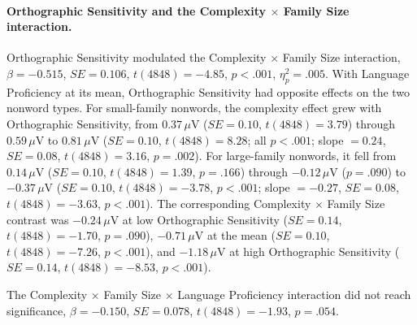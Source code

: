 \documentclass[utf8]{FrontiersinHarvard} %
\begin{document}
\paragraph*{Orthographic Sensitivity and the Complexity $\times$ Family Size interaction.} Orthographic Sensitivity modulated the Complexity $\times$ Family Size interaction, $\beta = -0.515$, $SE = 0.106$, $t(4848) = -4.85$, $p < .001$, $\eta^2_p = .005$. With Language Proficiency at its mean, Orthographic Sensitivity had opposite effects on the two nonword types. For small-family nonwords, the complexity effect grew with Orthographic Sensitivity, from $0.37\,\mu$V ($SE = 0.10$, $t(4848) = 3.79$) through $0.59\,\mu$V to $0.81\,\mu$V ($SE = 0.10$, $t(4848) = 8.28$; all $p < .001$; slope $= 0.24$, $SE = 0.08$, $t(4848) = 3.16$, $p = .002$). For large-family nonwords, it fell from $0.14\,\mu$V ($SE = 0.10$, $t(4848) = 1.39$, $p = .166$) through $-0.12\,\mu$V ($p = .090$) to $-0.37\,\mu$V ($SE = 0.10$, $t(4848) = -3.78$, $p < .001$; slope $= -0.27$, $SE = 0.08$, $t(4848) = -3.63$, $p < .001$). The corresponding Complexity $\times$ Family Size contrast was $-0.24\,\mu$V at low Orthographic Sensitivity ($SE = 0.14$, $t(4848) = -1.70$, $p = .090$), $-0.71\,\mu$V at the mean ($SE = 0.10$, $t(4848) = -7.26$, $p < .001$), and $-1.18\,\mu$V at high Orthographic Sensitivity ($SE = 0.14$, $t(4848) = -8.53$, $p < .001$).

The Complexity $\times$ Family Size $\times$ Language Proficiency interaction did not reach significance, $\beta = -0.150$, $SE = 0.078$, $t(4848) = -1.93$, $p = .054$.
\end{document}
